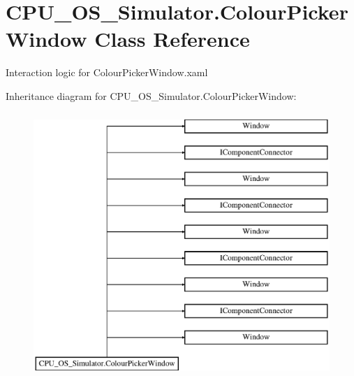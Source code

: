 \hypertarget{class_c_p_u___o_s___simulator_1_1_colour_picker_window}{}\section{C\+P\+U\+\_\+\+O\+S\+\_\+\+Simulator.\+Colour\+Picker\+Window Class Reference}
\label{class_c_p_u___o_s___simulator_1_1_colour_picker_window}


Interaction logic for Colour\+Picker\+Window.\+xaml  


Inheritance diagram for C\+P\+U\+\_\+\+O\+S\+\_\+\+Simulator.\+Colour\+Picker\+Window\+:\begin{figure}[H]
\begin{center}
\leavevmode
\includegraphics[height=10.000000cm]{class_c_p_u___o_s___simulator_1_1_colour_picker_window}
\end{center}
\end{figure}
